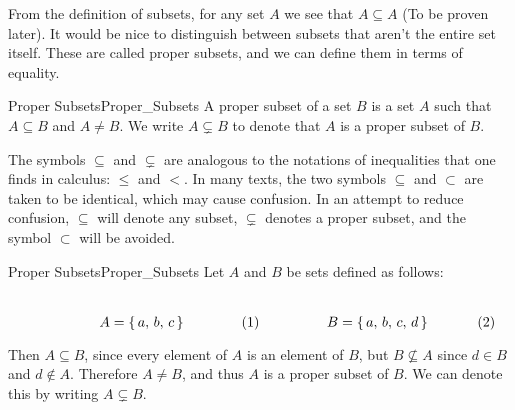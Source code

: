         From the definition of subsets, for any set $A$ we see that
        $A\subseteq{A}$ (To be proven later). It would be nice to distinguish
        between subsets that aren't the entire set itself. These are called
        proper subsets, and we can define them in terms of equality.
        \begin{fdefinition}{Proper Subsets}{Proper_Subsets}
            A proper subset of a set $B$ is a set $A$ such that
            $A\subseteq{B}$ and $A\ne{B}$. We write $A\subsetneq{B}$
            to denote that $A$ is a proper subset of $B$.
        \end{fdefinition}
        The symbols $\subseteq$ and $\subsetneq$ are analogous to the
        notations of inequalities that one finds in calculus: $\leq$ and $<$.
        In many texts, the two symbols $\subseteq$ and $\subset$ are taken to
        be identical, which may cause confusion. In an attempt to reduce
        confusion, $\subseteq$ will denote any subset, $\subsetneq$ denotes a
        proper subset, and the symbol $\subset$ will be avoided.
        \begin{lexample}{Proper Subsets}{Proper_Subsets}
            Let $A$ and $B$ be sets defined as follows:
            \par
            \begin{subequations}
                \begin{minipage}[b]{0.49\textwidth}
                    \centering
                    \begin{equation}
                        A=\{\,a,\,b,\,c\,\}
                    \end{equation}
                \end{minipage}
                \hfill
                \begin{minipage}[b]{0.49\textwidth}
                    \centering
                    \begin{equation}
                        B=\{\,a,\,b,\,c,\,d\,\}
                    \end{equation}
                \end{minipage}
            \end{subequations}
            \par\vspace{2.5ex}
            Then $A\subseteq{B}$, since every element of $A$ is an
            element of $B$, but $B\nsubseteq{A}$ since $d\in{B}$ and
            $d\notin{A}$. Therefore $A\ne{B}$, and thus $A$ is a proper
            subset of $B$. We can denote this by writing $A\subsetneq{B}$.
        \end{lexample}
